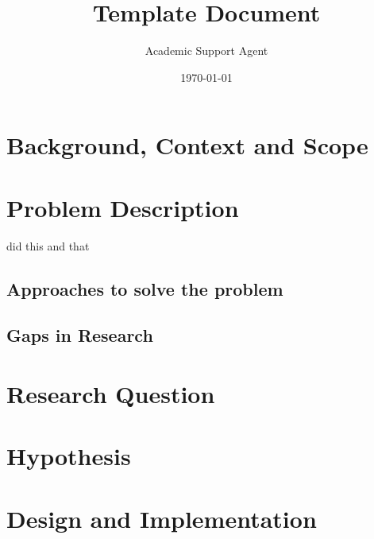 \documentclass{article}
\title{Template Document}
\author{Academic Support Agent}
\date{\today}
\begin{document}
\maketitle

\maketitle
\thispagestyle{fancy} 			%

\section{Background, Context and Scope}

\section{Problem Description}
\cite{Goodfellow2014} did this and that

\subsection{Approaches to solve the problem}
\subsection{Gaps in Research}
\section{Research Question}


\section{Hypothesis}
\section{Design and Implementation}
\end{document}

